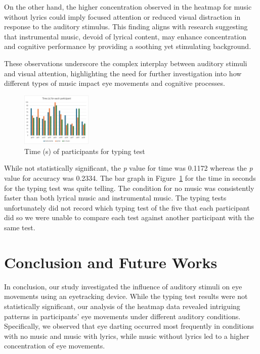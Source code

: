 \documentclass[manuscript, screen, review]{acmart} %
\begin{document}
On the other hand, the higher concentration observed in the heatmap for music without lyrics could imply focused attention or reduced visual distraction in response to the auditory stimulus. This finding aligns with research suggesting that instrumental music, devoid of lyrical content, may enhance concentration and cognitive performance by providing a soothing yet stimulating background.

These observations underscore the complex interplay between auditory stimuli and visual attention, highlighting the need for further investigation into how different types of music impact eye movements and cognitive processes.


\begin{figure}
  \includegraphics[width=0.3\textwidth]{time}
  \caption{Time (s) of participants for typing test}
  \label{timeL}
\end{figure}

While not statistically significant, the \textit{p} value for time was 0.1172 whereas the \textit{p} value for accuracy was 0.2334.
The bar graph in Figure~\ref{timeL} for the time in seconds for the typing test was quite telling. The condition for no music was consistently faster than both
lyrical music and instrumental music. The typing tests unfortunately did not record which typing test of the five that each participant did so we
were unable to compare each test against another participant with the same test.

\section{Conclusion and Future Works}
In conclusion, our study investigated the influence of auditory stimuli on eye movements using an eyetracking device. While the typing test results were not statistically significant, our analysis of the heatmap data revealed intriguing patterns in participants' eye movements under different auditory conditions. Specifically, we observed that eye darting occurred most frequently in conditions with no music and music with lyrics, while music without lyrics led to a higher concentration of eye movements.
\end{document}
